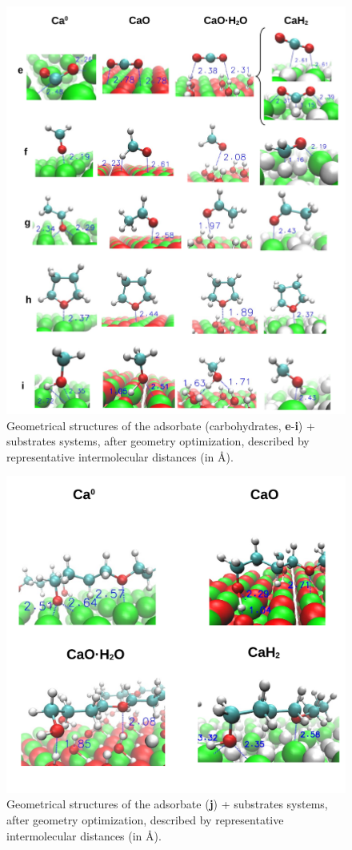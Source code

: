 \documentclass[journal=jpccck,manuscript=article]{achemso}
\begin{document}
\begin{figure}[!h]
	\centering
	\includegraphics[width=\linewidth]{Figure9}
	\caption{Geometrical structures of the adsorbate (carbohydrates, \textbf{e}-\textbf{i}) + substrates systems, after geometry optimization, described by representative intermolecular distances (in \si{\angstrom}).}
	\label{fig:distsei}
\end{figure}

\begin{figure}[!h]
	\centering
	\includegraphics[width=.7\linewidth]{Figure10}
	\caption{Geometrical structures of the adsorbate (\textbf{j}) + substrates systems, after geometry optimization, described by representative intermolecular distances (in \si{\angstrom}).}
	\label{fig:distsj}
\end{figure}
\end{document}
